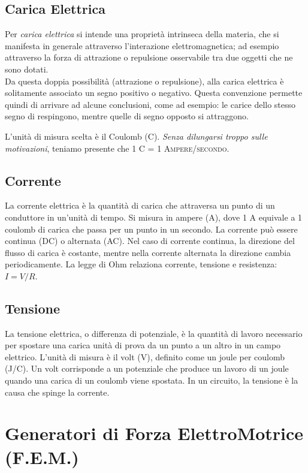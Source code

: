 \subsection{Carica Elettrica}
Per \textit{carica elettrica} si intende una proprietà intrinseca della materia, che si manifesta in generale attraverso l'interazione elettromagnetica; ad esempio attraverso la forza di attrazione o repulsione osservabile tra due oggetti che ne sono dotati. \\
Da questa doppia possibilità (attrazione o repulsione), alla carica elettrica è solitamente associato un segno positivo o negativo. Questa convenzione permette quindi di arrivare ad alcune conclusioni, come ad esempio: le carice dello stesso segno di respingono,
mentre quelle di segno opposto si attraggono.\\
\begin{FullStkyNote}
L'unità di misura scelta è il Coulomb (C). \textit{Senza dilungarsi troppo sulle motivazioni}, teniamo presente che \textsc{1 C = 1 Ampere/secondo}.
\end{FullStkyNote}


\subsection{Corrente}
La corrente elettrica è la quantità di carica che attraversa un punto di un conduttore in un'unità di tempo. Si misura in ampere (A), dove 1 A equivale a 1 coulomb di carica che passa per un punto in un secondo. La corrente può essere continua (DC) o alternata (AC). Nel caso di corrente continua, la direzione del flusso di carica è costante, mentre nella corrente alternata la direzione cambia periodicamente. La legge di Ohm relaziona corrente, tensione e resistenza: \(I = V/R\).
\subsection{Tensione}
La tensione elettrica, o differenza di potenziale, è la quantità di lavoro necessario per spostare una carica unità di prova da un punto a un altro in un campo elettrico. L'unità di misura è il volt (V), definito come un joule per coulomb (J/C). Un volt corrisponde a un potenziale che produce un lavoro di un joule quando una carica di un coulomb viene spostata. In un circuito, la tensione è la causa che spinge la corrente.

\section{Generatori di Forza ElettroMotrice (F.E.M.)}

\section{}